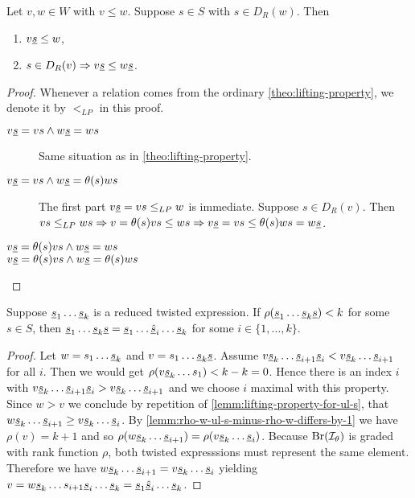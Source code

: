 \begin{lemm}
	Let $v,w \in W$ with $v \leq w$. Suppose $s \in S$ with $s \in D_R(w)$. Then
	\begin{enumerate}
		\item $v \underline{s} \leq w$,
		\item $s \in D_R(v) \Rightarrow v \underline{s} \leq w \underline{s}$.
	\end{enumerate}

	\begin{proof}
		Whenever a relation comes from the ordinary \ref{theo:lifting-property}, we denote it by $<_{LP}$ in this proof.
		\begin{description}
			\item[$v \underline{s} = vs \wedge w \underline{s} = ws$] Same situation as in \ref{theo:lifting-property}.
			\item[$v \underline{s} = vs \wedge w \underline{s} = \theta(s)ws$] The first part $v \underline{s} = vs \leq_{LP} w$ is immediate. Suppose $s \in D_R(v)$. Then $vs \leq_{LP} ws \Rightarrow v = \theta(s)vs \leq ws \Rightarrow v \underline{s} = vs \leq \theta(s)ws = w \underline{s}$. 
			\item[$v \underline{s} = \theta(s)vs \wedge w \underline{s} = ws$] \todo
			\item[$v \underline{s} = \theta(s)vs \wedge w \underline{s} = \theta(s)ws$] \todo \qedhere
		\end{description}
	\end{proof}
\end{lemm}

\begin{prop}
	Suppose $\underline{s}_1 \ldots \underline{s}_k$ is a reduced twisted expression. If $\rho(\underline{s}_1 \ldots \underline{s}_k \underline{s}) < k$ for some $s \in S$, then
	$\underline{s}_1 \ldots \underline{s}_k \underline{s} = \underline{s}_1 \ldots \underline{\hat s}_i \ldots \underline{s}_k$
	for some $i \in \{1,\ldots,k\}$.
	
	\begin{proof}
		Let $w = s_1 \ldots \underline{s}_k$ and $v = s_1 \ldots \underline{s}_k \underline{s}$. Assume $v \underline{s}_k \ldots \underline{s}_{i+1} \underline{s}_i < v \underline{s}_k \ldots \underline{s}_{i+1}$ for all $i$. Then we would get $\rho(v \underline{s}_k \ldots s_1) < k - k = 0$. Hence there is an index $i$ with $v \underline{s}_k \ldots \underline{s}_{i+1} \underline{s}_i > v \underline{s}_k \ldots \underline{s}_{i+1}$ and we choose $i$ maximal with this property. Since $w > v$ we conclude by repetition of \ref{lemm:lifting-property-for-ul-s}, that $w \underline{s}_k \ldots \underline{s}_{i+1} \geq v \underline{s}_k \ldots \underline{s}_i$. By \ref{lemm:rho-w-ul-s-minus-rho-w-differs-by-1} we have $\rho(v) = k + 1$ and so $\rho(w \underline{s}_k \ldots \underline{s}_{i+1}) = \rho(v \underline{s}_k \ldots \underline{s}_i)$. Because $\operatorname{Br}(\mathcal{I}_{\theta})$ is graded with rank function $\rho$, both twisted expresssions must represent the same element. Therefore we have $w \underline{s}_k \ldots \underline{s}_{i+1} = v \underline{s}_k \ldots \underline{s}_i$ yielding $v = w \underline{s}_k \ldots s_{i+1} \underline{s}_i \ldots \underline{s}_k = \underline{s}_1 \underline{\hat s}_i \ldots \underline{s}_k$.
	\end{proof}
\end{prop}

